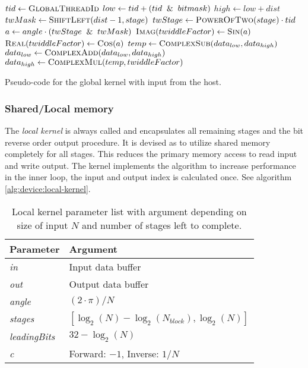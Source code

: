 \begin{algorithm}
	\centering
	\begin{algorithmic}[1]
            \State $tid \gets \Call{GlobalThreadId}{}$ 
            \State $low \gets tid + (tid \And bitmask)$
            \State $high \gets low + dist$
            \newline
            \State $twMask \gets \Call{ShiftLeft}{dist - 1, stage}$
            \State $twStage \gets \Call{PowerOfTwo}{stage} \cdot tid$
            \State $a \gets angle \cdot (twStage \And twMask)$
            \State $\Call{Imag}{twiddleFactor} \gets \Call{Sin}{a}$
            \State $\Call{Real}{twiddleFactor} \gets \Call{Cos}{a}$
            \newline
            \State $temp \gets \Call{ComplexSub}{data_{low}, data_{high}}$
            \State $data_{low} \gets \Call{ComplexAdd}{data_{low}, data_{high}}$
            \State $data_{high} \gets \Call{ComplexMul}{temp, twiddleFactor}$
        \EndProcedure
	\end{algorithmic}
	\caption{Pseudo-code for the global kernel with input from the host.}
	\label{alg:device:global-kernel}
\end{algorithm}

\subsubsection{Shared/Local memory}

The \textit{local kernel} is always called and encapsulates all remaining stages and the bit reverse order output procedure. It is devised as to utilize shared memory completely for all stages. This reduces the primary memory access to read input and write output. The kernel implements the {\CGALG} algorithm to increase performance in the inner loop, the input and output index is calculated once. See algorithm \ref{alg:device:local-kernel}.

\begin{table}
	\centering
	\begin{tabular}{|l|l|}
		\hline
		Parameter & Argument \\ \hline
		\textit{in} & Input data buffer \\ \hline
		\textit{out} & Output data buffer \\ \hline
		\textit{angle} & $(2 \cdot \pi)/N$ \\ \hline
		\textit{stages} & $[\log_{2}(N) - \log_{2}(N_{block}), \log_{2}(N)]$ \\ \hline
		\textit{leadingBits} & $32 - \log_{2}(N)$ \\ \hline
		\textit{c} & Forward: $-1$, Inverse: $1/N$ \\ \hline
	\end{tabular}
	\caption{Local kernel parameter list with argument depending on size of input $N$ and number of stages left to complete.}
	\label{tab:local-kernel}
\end{table}

